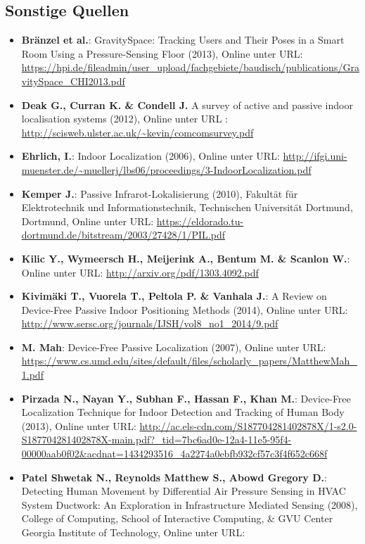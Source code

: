 \subsection*{Sonstige Quellen}
\begin{itemize}[leftmargin=*]
\item[] \textbf{Bränzel et al.}: GravitySpace: Tracking Users and Their Poses in a Smart Room Using a Pressure-Sensing Floor (2013), Online unter URL: \url{https://hpi.de/fileadmin/user_upload/fachgebiete/baudisch/publications/GravitySpace_CHI2013.pdf}
\item[] \textbf{Deak G., Curran K. \& Condell J.} A survey of active and passive indoor localisation systems (2012), Online unter URL : \url{http://scisweb.ulster.ac.uk/~kevin/comcomsurvey.pdf}
\item[] \textbf{Ehrlich, I.}: Indoor Localization (2006), Online unter URL: \url{http://ifgi.uni-muenster.de/~muellerj/lbs06/proceedings/3-IndoorLocalization.pdf}
\item[] \textbf{Kemper J.}: Passive Infrarot-Lokalisierung (2010), Fakultät für Elektrotechnik und Informationstechnik, Technischen Universität Dortmund, Dortmund, Online unter URL: \url{https://eldorado.tu-dortmund.de/bitstream/2003/27428/1/PIL.pdf}
\item[] \textbf{Kilic Y., Wymeersch H., Meijerink A., Bentum M. \& Scanlon W.}: Online unter URL: \url{http://arxiv.org/pdf/1303.4092.pdf}
\item[] \textbf{Kivimäki T., Vuorela T., Peltola P. \& Vanhala J.}: A Review on Device-Free Passive Indoor Positioning Methods (2014), Online unter URL: \url{http://www.sersc.org/journals/IJSH/vol8_no1_2014/9.pdf}
\item[] \textbf{M. Mah}: Device-Free Passive Localization (2007), Online unter URL: \url{https://www.cs.umd.edu/sites/default/files/scholarly_papers/MatthewMah_1.pdf}
\item[] \textbf{Pirzada N., Nayan Y., Subhan F., Hassan F., Khan M.}: Device-Free Localization Technique for Indoor Detection and Tracking of Human Body (2013), Online unter URL: \url{http://ac.els-cdn.com/S187704281402878X/1-s2.0-S187704281402878X-main.pdf?_tid=7bc6ad0e-12a4-11e5-95f4-00000aab0f02&acdnat=1434293516_4a2274a0ebfb932cf57c3f4f652c668f}
\item[] \textbf{Patel Shwetak N., Reynolds Matthew S., Abowd Gregory D.}: Detecting Human Movement by Differential Air
Pressure Sensing in HVAC System Ductwork: An Exploration in Infrastructure Mediated Sensing (2008), College of Computing, School of Interactive Computing, \& GVU Center Georgia Institute of Technology, Online unter URL: 

\end{itemize}
